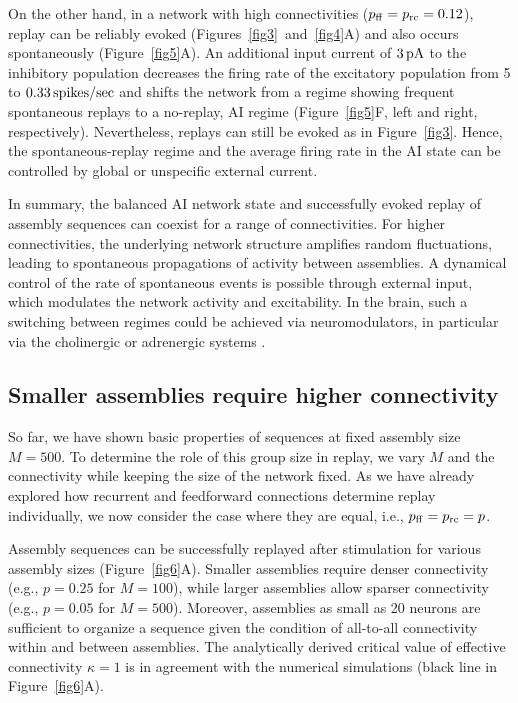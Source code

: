     On the other hand, in a network with high connectivities ($p_{\rm
    ff}=p_{\rm rc} = 0.12$), replay can be reliably evoked
    (Figures~\ref{fig3}~and~\ref{fig4}A) and also occurs spontaneously
    (Figure~\ref{fig5}A). An additional input current of $3 \, \rm pA$ to the
    inhibitory population decreases the firing rate of the excitatory
    population from 5 to $0.33 \, \rm spikes/sec$ and shifts the network from a
    regime showing frequent spontaneous replays to a no-replay, AI regime
    (Figure~\ref{fig5}F, left and right, respectively). Nevertheless, replays can
    still be evoked as in Figure~\ref{fig3}. Hence, the spontaneous-replay regime
    and the average firing rate in the AI state can be controlled by global or
    unspecific external current.

    In summary, the balanced AI network state and successfully evoked replay of
    assembly sequences can coexist for a range of connectivities.  For higher
    connectivities, the underlying network structure amplifies random
    fluctuations, leading to spontaneous propagations of activity between
    assemblies.  A dynamical control of the rate of spontaneous events is
    possible through external input, which modulates the network activity and
    excitability.  In the brain, such a switching between regimes could be
    achieved via neuromodulators, in particular via the cholinergic or
    adrenergic systems \citep{Hasselmo1995, Thomas2015}.

  \subsection{Smaller assemblies require higher connectivity}
    So far, we have shown basic properties of sequences at fixed assembly size
    $M=500$. To determine the role of this group size in replay, we vary $M$
    and the connectivity while keeping the size of the network fixed. As we
    have already explored how recurrent and feedforward connections determine
    replay individually, we now consider the case where they are equal, i.e.,
    $p_{\rm ff}= p_{\rm rc}=p$.

    Assembly sequences can be successfully replayed after stimulation for
    various assembly sizes (Figure~\ref{fig6}A). Smaller assemblies require denser
    connectivity (e.g., $p = 0.25$ for $M=100$), while larger assemblies allow
    sparser connectivity (e.g., $p=0.05$ for $M=500$). Moreover, assemblies as
    small as 20 neurons are sufficient to organize a sequence given the
    condition of all-to-all connectivity within and between assemblies. The
    analytically derived critical value of effective connectivity $\kappa=1$ is
    in agreement with the numerical simulations (black line in
    Figure~\ref{fig6}A).

